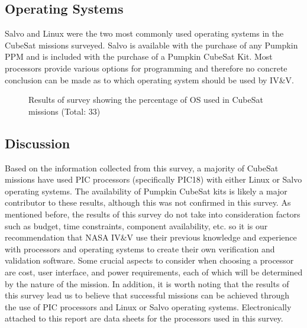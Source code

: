 \documentclass[11pt]{article}
\begin{document}
\subsection{Operating Systems}
Salvo and Linux were the two most commonly used operating systems in the CubeSat missions surveyed.  Salvo is available with the purchase of any Pumpkin PPM and is included with the purchase of a Pumpkin CubeSat Kit.  Most processors provide various options for programming and therefore no concrete conclusion can be made as to which operating system should be used by IV\&V.

\begin{figure}[h !]
\centering
{}
\caption{Results of survey showing the percentage of OS used in CubeSat missions (Total: 33)}
\label{OS}
\end{figure}

\subsection{Discussion}
Based on the information collected from this survey, a majority of CubeSat missions have used PIC processors (specifically PIC18) with either Linux or Salvo operating systems.  The availability of Pumpkin CubeSat kits is likely a major contributor to these results, although this was not confirmed in this survey.  As mentioned before, the results of this survey do not take into consideration factors such as budget, time constraints, component availability, etc. so it is our recommendation that NASA IV\&V use their previous knowledge and experience with processors and operating systems to create their own verification and validation software.  Some crucial aspects to consider when choosing a processor are cost, user interface, and power requirements, each of which will be determined by the nature of the mission.  In addition, it is worth noting that the results of this survey lead us to believe that successful missions can be achieved through the use of PIC processors and Linux or Salvo operating systems.  Electronically attached to this report are data sheets for the processors used in this survey.
\end{document}
